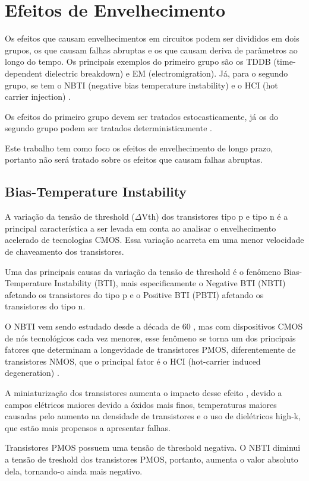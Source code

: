 \section{Efeitos de Envelhecimento}
Os efeitos que causam envelhecimentos em circuitos podem ser divididos em dois grupos, os que causam falhas abruptas e os que causam deriva de parâmetros ao longo do tempo. Os principais exemplos do primeiro grupo são os TDDB (time-dependent dielectric breakdown) e EM (electromigration). Já, para o segundo grupo, se tem o NBTI (negative bias temperature instability) e o HCI (hot carrier injection) \cite{Lorenz}.

Os efeitos do primeiro grupo devem ser tratados estocasticamente, já os do segundo grupo podem ser tratados deterministicamente \cite{Lorenz}.

Este trabalho tem como foco os efeitos de envelhecimento de longo prazo, portanto não será tratado sobre os efeitos que causam falhas abruptas.

\subsection{Bias-Temperature Instability}
A variação da tensão de threshold ($\Delta$Vth) dos transistores tipo p e tipo n é a principal característica a ser levada em conta ao analisar o envelhecimento acelerado de tecnologias CMOS. Essa variação acarreta em uma menor velocidade de chaveamento dos transistores.

Uma das principais causas da variação da tensão de threshold é o fenômeno Bias-Temperature Instability (BTI), mais especificamente o Negative BTI (NBTI) afetando os transistores do tipo p e o Positive BTI (PBTI) afetando os transistores do tipo n.

O NBTI vem sendo estudado desde a década de 60 \cite{Alam}, mas com dispositivos CMOS de nós tecnológicos cada vez menores, esse fenômeno se torna um dos principais fatores que determinam a longevidade de transistores PMOS, diferentemente de transistores NMOS, que o principal fator é o HCI (hot-carrier induced degeneration) \cite{Bhardwaj}.

A miniaturização dos transistores aumenta o impacto desse efeito \cite{Banaszeski}, devido a campos elétricos maiores devido a óxidos mais finos, temperaturas maiores causadas pelo aumento na densidade de transistores e o uso de dielétricos high-k, que estão mais propensos a apresentar falhas.

Transistores PMOS possuem uma tensão de threshold negativa. O NBTI diminui a tensão de treshold dos transistores PMOS, portanto, aumenta o valor absoluto dela, tornando-o ainda mais negativo.




% 
